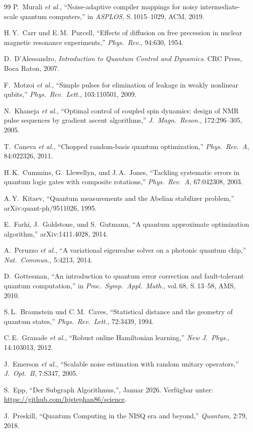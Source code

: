 ﻿\documentclass[11pt,a4paper]{article}
\theoremstyle{definition}
\begin{document}
\begin{thebibliography}{99}
P.\ Murali \textit{et al.},
``Noise-adaptive compiler mappings for noisy intermediate-scale quantum computers,''
in \textit{ASPLOS}, S.\,1015--1029, ACM, 2019.

H.\,Y.\ Carr und E.\,M.\ Purcell,
``Effects of diffusion on free precession in nuclear magnetic resonance experiments,''
\textit{Phys.\ Rev.}, 94:630, 1954.

D.\ D'Alessandro,
\textit{Introduction to Quantum Control and Dynamics}.
CRC Press, Boca Raton, 2007.

F.\ Motzoi \textit{et al.},
``Simple pulses for elimination of leakage in weakly nonlinear qubits,''
\textit{Phys.\ Rev.\ Lett.}, 103:110501, 2009.

N.\ Khaneja \textit{et al.},
``Optimal control of coupled spin dynamics: design of NMR pulse sequences by gradient ascent algorithms,''
\textit{J.\ Magn.\ Reson.}, 172:296--305, 2005.

T.\ Caneva \textit{et al.},
``Chopped random-basis quantum optimization,''
\textit{Phys.\ Rev.\ A}, 84:022326, 2011.

H.\,K.\ Cummins, G.\ Llewellyn, und J.\,A.\ Jones,
``Tackling systematic errors in quantum logic gates with composite rotations,''
\textit{Phys.\ Rev.\ A}, 67:042308, 2003.

A.\,Y.\ Kitaev,
``Quantum measurements and the Abelian stabilizer problem,''
arXiv:quant-ph/9511026, 1995.

E.\ Farhi, J.\ Goldstone, und S.\ Gutmann,
``A quantum approximate optimization algorithm,''
arXiv:1411.4028, 2014.

A.\ Peruzzo \textit{et al.},
``A variational eigenvalue solver on a photonic quantum chip,''
\textit{Nat.\ Commun.}, 5:4213, 2014.

D.\ Gottesman,
``An introduction to quantum error correction and fault-tolerant quantum computation,''
in \textit{Proc.\ Symp.\ Appl.\ Math.}, vol.\,68, S.\,13--58, AMS, 2010.

S.\,L.\ Braunstein und C.\,M.\ Caves,
``Statistical distance and the geometry of quantum states,''
\textit{Phys.\ Rev.\ Lett.}, 72:3439, 1994.

C.\,E.\ Granade \textit{et al.},
``Robust online Hamiltonian learning,''
\textit{New J.\ Phys.}, 14:103013, 2012.

J.\ Emerson \textit{et al.},
``Scalable noise estimation with random unitary operators,''
\textit{J.\ Opt.\ B}, 7:S347, 2005.


S.\ Epp,
``Der Subgraph Algorithmus,'', Januar 2026.
Verfügbar unter: \url{https://github.com/hjstephan86/science}.

J.\ Preskill,
``Quantum Computing in the NISQ era and beyond,''
\textit{Quantum}, 2:79, 2018.

\end{thebibliography}
\end{document}
